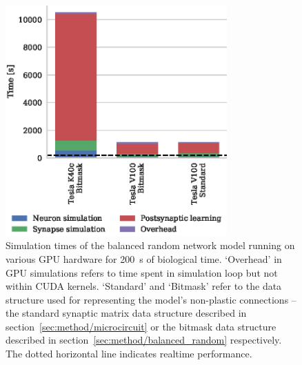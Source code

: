 \documentclass[utf8]{frontiersSCNS} %
\begin{document}
\begin{figure}
    \begin{center}
        \includegraphics[width=85mm]{figures/stdp_performance}
    \end{center}
    \caption{Simulation times of the balanced random network model running on various GPU hardware for \SI{200}{\second} of biological time.
    `Overhead' in GPU simulations refers to time spent in simulation loop but not within CUDA kernels.
    `Standard' and `Bitmask' refer to the data structure used for representing the model's non-plastic connections -- the standard synaptic matrix data structure described in section~\ref{sec:method/microcircuit} or the bitmask data structure described in section~\ref{sec:method/balanced_random} respectively.
    The dotted horizontal line indicates realtime performance.}
    \label{fig:stdp_performance}
\end{figure}
\end{document}
